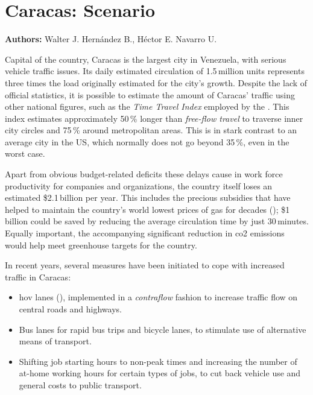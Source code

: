 \chapter{Caracas: Scenario}
\label{ch:caracas}
\hfill \textbf{Authors:} Walter J. Hernández B., Héctor E. Navarro U.


Capital of the country, Caracas is the largest city in Venezuela, with serious vehicle traffic issues. Its daily estimated circulation of 1.5\,million units represents three times the load originally estimated for the city's growth. %
Despite the lack of official statistics, it is possible to estimate the amount of Caracas' traffic using other national figures, such as the \emph{Time Travel Index} employed by the \citet{fhwa2013}. This index estimates approximately 50\,\% longer than \emph{free-flow travel} to traverse inner city circles and 75\,\% around  metropolitan areas. This is in stark contrast to an average city in the US, which normally does not go beyond 35\,\%, even in the worst case.

Apart from obvious budget-related deficits these delays cause in work force productivity for companies and organizations, the country itself loses an estimated \$2.1\,billion per year. This includes the precious subsidies that have helped to maintain the country's world lowest prices of gas for decades (\citet{wilson2008}); \$1\,billion could be saved by reducing the average circulation time by just 30\,minutes. Equally important, the accompanying significant reduction in \gls{co2} emissions would help meet greenhouse targets for the country.

In recent years, several measures have been initiated to cope with increased traffic in Caracas:

\begin{itemize}\styleItemize
\item \gls{hov} lanes (\citet{turnbull1990}), implemented in a \emph{contraflow} fashion to increase traffic flow on central roads and highways.

\item Bus lanes for rapid bus trips and bicycle lanes, to stimulate use of alternative means of transport.

\item Shifting job starting hours to non-peak times and increasing the number of at-home working hours for certain types of jobs, to cut back vehicle use and general costs to public transport.
\end{itemize}

